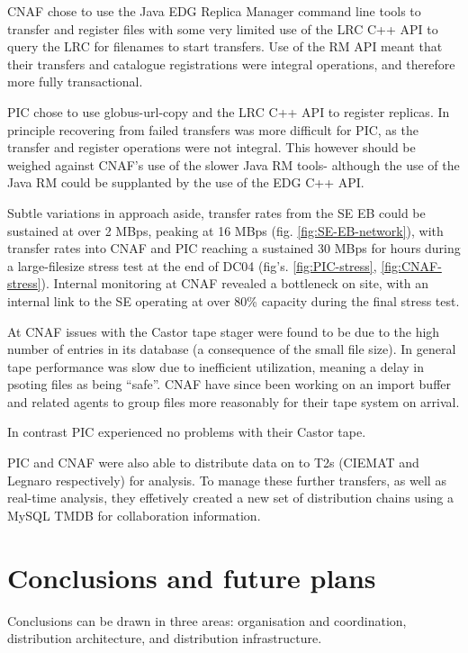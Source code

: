 \documentclass{cmspaper}
\begin{document}
CNAF chose to use the Java EDG Replica Manager command line tools to
transfer and register files with some very limited use of the LRC C++
API to query the LRC for filenames to start transfers. Use of the RM
API meant that their transfers and catalogue registrations were
integral operations, and therefore more fully transactional.

PIC chose to use globus-url-copy and the LRC C++ API to register
replicas. In principle recovering from failed transfers was more
difficult for PIC, as the transfer and register operations were not
integral. This however should be weighed against CNAF's use of the
slower Java RM tools- although the use of the Java RM could be
supplanted by the use of the EDG C++ API.

Subtle variations in approach aside, transfer rates from the SE EB
could be sustained at over 2 MBps, peaking at 16 MBps
(fig. \ref{fig:SE-EB-network}), with transfer rates into CNAF and PIC
reaching a sustained 30 MBps for hours during a large-filesize stress
test at the end of DC04 (fig's. \ref{fig:PIC-stress},
\ref{fig:CNAF-stress}). Internal monitoring at CNAF revealed a
bottleneck on site, with an internal link to the SE operating at over
80\% capacity during the final stress test.

At CNAF issues with the Castor tape stager were found to be due to the
high number of entries in its database (a consequence of the small
file size). In general tape performance was slow due to inefficient
utilization, meaning a delay in psoting files as being ``safe''. CNAF
have since been working on an import buffer and related agents to
group files more reasonably for their tape system on arrival.

In contrast PIC experienced no problems with their Castor tape.

PIC and CNAF were also able to distribute data on to T2s (CIEMAT and
Legnaro respectively) for analysis. To manage these further transfers,
as well as real-time analysis, they effetively created a new set of
distribution chains using a MySQL TMDB for collaboration information.

\section{Conclusions and future plans}
Conclusions can be drawn in three areas: organisation and coordination, distribution 
architecture, and distribution infrastructure.
\end{document}
